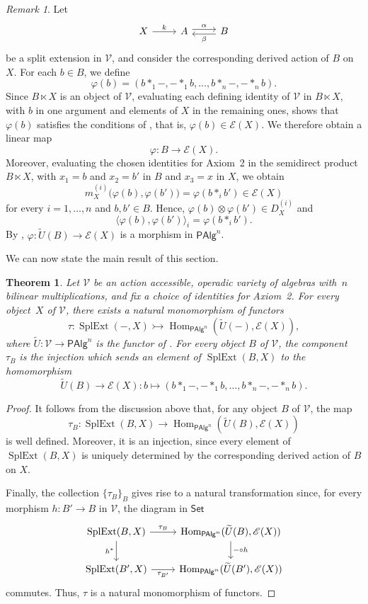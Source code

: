 \documentclass[reqno,a4paper]{amsart}
\theoremstyle{plain}
\newtheorem{theorem}[subsection]{Theorem}
\theoremstyle{definition}
\theoremstyle{remark}
\newtheorem{remark}[subsection]{Remark}
\numberwithin{equation}{section}
\newcommand{\E}{\mathcal{E}}
\newcommand{\V}{\mathcal{V}}
\DeclareMathOperator{\Hom}{Hom}
\DeclareMathOperator{\SplExt}{SplExt}
\newcommand{\Set}{\ensuremath{\mathsf{Set}}}
\newcommand{\PAlg}{\ensuremath{\mathsf{PAlg}}}
\begin{document}
\begin{remark}
Let
\[
\begin{tikzcd}
X \arrow[r, "k"]
&
A \arrow[r, shift left, "\alpha"]
&
B \arrow[l, shift left, "\beta"]
\end{tikzcd}
\]
be a split extension in $\V$, and consider the corresponding derived action of $B$ on $X$. For each $b\in B$, we define
\[
\varphi(b)
=
(b\ast_1-,-\ast_1 b,\ldots,b \ast_n -, - \ast_n b).
\]
Since $B\ltimes X$ is an object of $\V$, evaluating each defining identity of $\V$ in $B\ltimes X$, with $b$ in one argument and elements of $X$ in the remaining ones, shows that $\varphi(b)$ satisfies the conditions of , that is, $\varphi(b)\in\E(X)$. We therefore obtain a linear map
\[
\varphi\colon B\to\E(X).
\]
Moreover, evaluating the chosen identities for Axiom~2 in the semidirect product $B\ltimes X$, with $x_1=b$ and $x_2=b'$ in $B$ and $x_3=x$ in $X$, we obtain
\[
m_X^{(i)}\bigl(\varphi(b),\varphi(b')\bigr)=\varphi(b\ast_i b')\in\E(X)
\]
for every $i=1,\ldots,n$ and $b,b'\in B$. Hence, $\varphi(b)\otimes\varphi(b')\in D_X^{(i)}$ and
\[
\langle\varphi(b),\varphi(b')\rangle_i=\varphi(b\ast_i b').
\]
By , $\varphi\colon\widetilde U(B)\to\E(X)$ is a morphism in $\PAlg^n$.
\end{remark}

We can now state the main result of this section.

\begin{theorem}\label{ExternalWeakRepresentationN}
Let $\V$ be an action accessible, operadic variety of algebras with~$n$ bilinear multiplications, and fix a choice of identities for Axiom~2. For every object~$X$ of $\V$, there exists a natural monomorphism of functors
\[
\tau\colon
\SplExt(-,X)
\rightarrowtail
\Hom_{\PAlg^n}(\widetilde U(-),\E(X)),
\]
where $\widetilde U\colon\V\to\PAlg^n$ is the functor of . For every object $B$ of $\V$, the component~$\tau_B$ is the injection which sends an element of $\SplExt(B,X)$ to the homomorphism
\[
\widetilde U(B)\to\E(X) \colon
b \mapsto
(b\ast_1-,-\ast_1 b,\ldots,b \ast_n -, - \ast_n b).
\]
\end{theorem}

\begin{proof}
It follows from the discussion above that, for any object $B$ of $\V$, the map
\[
\tau_B \colon \SplExt(B,X) \to \Hom_{\PAlg^n}(\widetilde U(B),\E(X))
\]
is well defined. Moreover, it is an injection, since every element of $\SplExt(B,X)$ is uniquely determined by the corresponding derived action of $B$ on $X$.

Finally, the collection $\{\tau_B\}_B$ gives rise to a natural transformation since, for every morphism $h\colon B'\to B$ in $\V$, the diagram in $\Set$
\[
\begin{tikzcd}
\SplExt(B,X)
    \arrow[r, "\tau_B"]
    \arrow[d, "{h^*}"']
&
\Hom_{\PAlg^n}(\widetilde U(B),\E(X))
    \arrow[d, "{- \circ h}"]
\\
\SplExt(B',X)
    \arrow[r, "\tau_{B'}"']
&
\Hom_{\PAlg^n}(\widetilde U(B'),\E(X))
\end{tikzcd}
\]
commutes. Thus, $\tau$ is a natural monomorphism of functors.
\end{proof}
\end{document}

